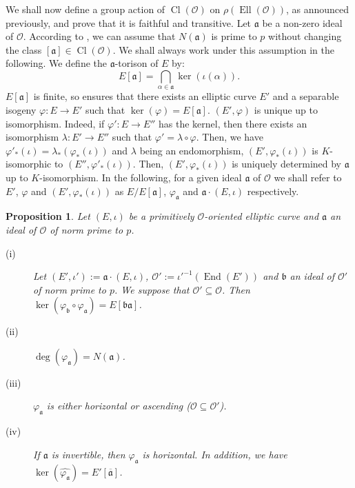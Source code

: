 \documentclass[a4paper,10pt,notitlepage]{report}
\theoremstyle{definition}
\theoremstyle{plain}
\newtheorem{Proposition}[Definition]{Proposition}
\theoremstyle{definition}
\newcommand{\mO}{\mathcal{O}}
\renewcommand{\(}{\left(}
\renewcommand{\)}{\right)}
\newcommand{\mf}[1]{\mathfrak{#1}}
\DeclareMathOperator{\End}{End}
\DeclareMathOperator{\Cl}{Cl}
\DeclareMathOperator{\Ell}{Ell}
\begin{document}
We shall now define a group action of $\Cl(\mO)$ on $\rho(\Ell(\mO))$, as announced previously, and prove that it is faithful and transitive. Let $\mf{a}$ be a non-zero ideal of $\mO$. According to \cite[Corollary 7.17]{Cox}, we can assume that $N(\mf{a})$ is prime to $p$ without changing the class $[\mf{a}]\in\Cl(\mO)$. We shall always work under this assumption in the following. We define the $\mf{a}$-torison of $E$ by:
\[E[\mf{a}]=\bigcap_{\alpha\in\mf{a}}\ker(\iota(\alpha)).\]
$E[\mf{a}]$ is finite, so \cite[Proposition III.4.12]{Silverman1} ensures that there exists an elliptic curve $E'$ and a separable isogeny $\varphi:E\longrightarrow E'$ such that $\ker(\varphi)=E[\mf{a}]$. $(E',\varphi)$ is unique up to isomorphism. Indeed, if $\varphi':E\longrightarrow E''$ has the kernel, then there exists an isomorphism $\lambda : E'\longrightarrow E''$ such that $\varphi'=\lambda\circ\varphi$. Then, we have $\varphi'_*(\iota)=\lambda_*(\varphi_*(\iota))$ and $\lambda$ being an endomorphism, $(E',\varphi_*(\iota))$ is $K$-isomorphic to $(E'',\varphi'_*(\iota))$. Then, $(E',\varphi_*(\iota))$ is uniquely determined by $\mf{a}$ up to $K$-isomorphism. In the following, for a given ideal $\mf{a}$ of $\mO$ we shall refer to  $E'$, $\varphi$ and $(E',\varphi_*(\iota))$ as $E/E[\mf{a}]$, $\varphi_{\mf{a}}$ and $\mf{a}\cdot(E,\iota)$ respectively.

\begin{Proposition}\label{Proposition 3}
Let $(E,\iota)$ be a primitively $\mO$-oriented elliptic curve and $\mf{a}$ an ideal of $\mO$ of norm prime to $p$. 
\begin{description}
\item[(i)] Let $(E',\iota'):=\mf{a}\cdot (E,\iota)$,  $\mO':=\iota'^{-1}(\End(E'))$ and $\mf{b}$ an ideal of $\mO'$ of norm prime to $p$.  We suppose that $\mO'\subseteq\mO$. Then $\ker(\varphi_{\mf{b}}\circ\varphi_{\mf{a}})=E[\mf{b}\mf{a}]$.
\item[(ii)] $\deg(\varphi_{\mf{a}})=N(\mf{a})$.
\item[(iii)] $\varphi_{\mf{a}}$ is either horizontal or ascending ($\mO\subseteq\mO'$).
\item[(iv)] If $\mf{a}$ is invertible, then $\varphi_{\mf{a}}$ is horizontal. In addition, we have $\ker(\widehat{\varphi_{\mf{a}}})=E'[\overline{\mf{a}}]$.
\end{description}
\end{Proposition}
\end{document}
